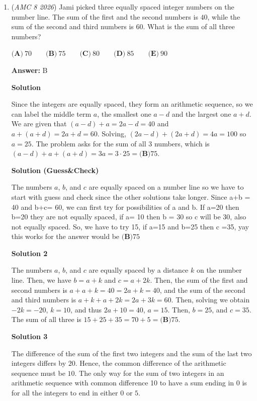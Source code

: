 \begin{enumerate}
	\item (\textit{AMC 8 2026}) Jami picked three equally spaced integer numbers on the number line. The sum of the first and the second numbers is $40$, while the sum of the second and third numbers is $60$. What is the sum of all three numbers?


 $\textbf{(A)}\ 70 \qquad \textbf{(B)}\ 75 \qquad \textbf{(C)}\ 80 \qquad \textbf{(D)}\ 85 \qquad \textbf{(E)}\ 90$

 \textbf{Answer: }B



\textbf{Solution}

Since the integers are equally spaced, they form an arithmetic sequence, so we can label the middle term $a$, the smallest one $a-d$ and the largest one $a+d$. We are given that $(a-d)+a=2a-d=40$ and $a+(a+d)=2a+d=60$. Solving, $(2a-d)+(2a+d)=4a=100$ so $a=25$. The problem asks for the sum of all 3 numbers, which is $(a-d)+a+(a+d)=3a=3 \cdot 25 = \boxed{\textbf{(B)} 75}$.

 



\textbf{Solution (Guess&Check)}

The numbers $a$, $b$, and $c$ are equally spaced on a number line so we have to start with guess and check since the other solutions take longer. Since a+b = 40 and b+c= 60, we can first try for possibilities of a and b. If a=20 then b=20 they are not equally spaced, if a= 10 then b = 30 so c will be 30, also not equally spaced. So, we have to try 15, if a=15 and b=25 then c =35, yay this works for the answer would be $\boxed{\textbf{(B)} 75}$




\textbf{Solution 2}

The numbers $a$, $b$, and $c$ are equally spaced by a distance $k$ on the number line. Then, we have $b = a+k$ and $c = a+2k$. Then, the sum of the first and second numbers is $a+a+k = 40 = 2a+k = 40$, and the sum of the second and third numbers is $a+k+a+2k = 2a+3k = 60$. Then, solving we obtain $-2k = -20$, $k = 10$, and thus $2a+10 = 40$, $a= 15$. Then, $b=25$, and $c=35$. The sum of all three is $15+25+35 = 70+5 = \boxed{\textbf{(B)} 75}$.

 



\textbf{Solution 3}

The difference of the sum of the first two integers and the sum of the last two integers differs by $20$. Hence, the common difference of the arithmetic sequence must be $10$. The only way for the sum of two integers in an arithmetic sequence with common difference 10 to have a sum ending in $0$ is for all the integers to end in either $0$ or $5.$


\end{enumerate}
